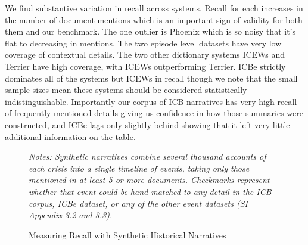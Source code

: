 \documentclass{article}
\begin{document}
We find substantive variation in recall across systems. Recall for each
increases in the number of document mentions which is an important sign
of validity for both them and our benchmark. The one outlier is Phoenix
which is so noisy that it's flat to decreasing in mentions. The two
episode level datasets have very low coverage of contextual details. The
two other dictionary systems ICEWs and Terrier have high coverage, with
ICEWs outperforming Terrier. ICBe strictly dominates all of the systems
but ICEWs in recall though we note that the small sample sizes mean
these systems should be considered statistically indistinguishable.
Importantly our corpus of ICB narratives has very high recall of
frequently mentioned details giving us confidence in how those summaries
were constructed, and ICBe lags only slightly behind showing that it
left very little additional information on the table.

\clearpage

\begin{figure}[H]
\caption{Measuring Recall with Synthetic Historical Narratives \label{fig:case_study_cuban_recall}}
\textit{Notes: Synthetic narratives combine several thousand accounts of each crisis into a single timeline of events, taking only those mentioned in at least 5 or more documents. Checkmarks represent whether that event could be hand matched to any detail in the ICB corpus, ICBe dataset, or any of the other event datasets (SI Appendix 3.2 and 3.3).}
\end{figure}
\clearpage
\end{document}
